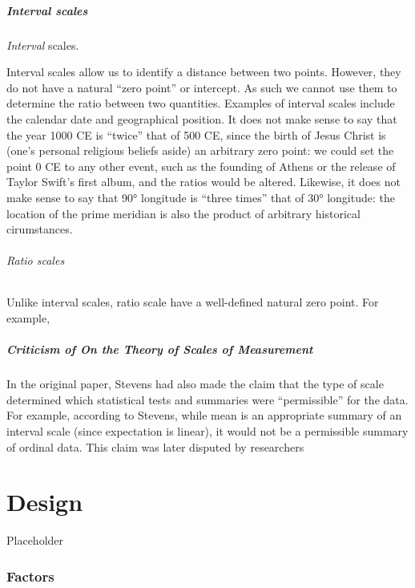 \documentclass[
]{book}
\theoremstyle{definition}
\theoremstyle{definition}
\theoremstyle{definition}
\theoremstyle{definition}
\theoremstyle{remark}
\begin{document}
\hypertarget{interval-scales}{%
\paragraph{Interval scales}\label{interval-scales}}

\emph{Interval} scales.

Interval scales allow us to identify a distance between two points. However, they do not have a natural ``zero point'' or intercept. As such we cannot use them to determine the ratio between two quantities. Examples of interval scales include the calendar date and geographical position. It does not make sense to say that the year 1000 CE is ``twice'' that of 500 CE, since the birth of Jesus Christ is (one's personal religious beliefs aside) an arbitrary zero point: we could set the point 0 CE to any other event, such as the founding of Athens or the release of Taylor Swift's first album, and the ratios would be altered. Likewise, it does not make sense to say that 90° longitude is ``three times'' that of 30° longitude: the location of the prime meridian is also the product of arbitrary historical cirumstances.

\hypertarget{ratio-scales}{%
\subparagraph{Ratio scales}\label{ratio-scales}}

Unlike interval scales, ratio scale have a well-defined natural zero point. For example,

\hypertarget{criticism-of-on-the-theory-of-scales-of-measurement}{%
\paragraph{Criticism of On the Theory of Scales of Measurement}\label{criticism-of-on-the-theory-of-scales-of-measurement}}

In the original paper, Stevens had also made the claim that the type of scale determined which statistical tests and summaries were ``permissible'' for the data. For example, according to Stevens, while mean is an appropriate summary of an interval scale (since expectation is linear), it would not be a permissible summary of ordinal data. This claim was later disputed by researchers

\hypertarget{design}{%
\chapter{Design}\label{design}}

Placeholder

\hypertarget{factors}{%
\subsection{Factors}\label{factors}}
\end{document}
